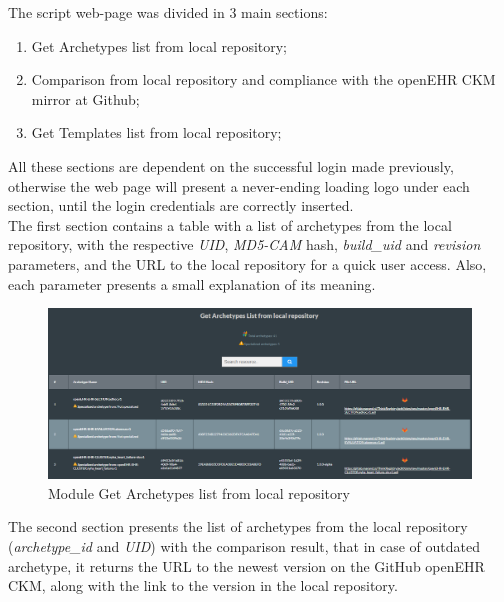 \documentclass[mim_thesis.tex]{subfiles}
\begin{document}
The script web-page was divided in 3 main sections: 

\begin{enumerate}[noitemsep]
\item Get Archetypes list from local repository;
\item Comparison from local repository and compliance with the openEHR CKM mirror at Github;
\item Get Templates list from local repository; 
\end{enumerate}

All these sections are dependent on the successful login made previously, otherwise the web page will present a never-ending loading logo under each section, until the login credentials are correctly inserted. \\

The first section contains a table with a list of archetypes from the local repository, with the respective \textit{UID}, \textit{MD5-CAM} hash, \textit{build\_uid} and \textit{revision} parameters, and the URL to the local repository for a quick user access. Also, each parameter presents a small explanation of its meaning. 

\begin{figure}[H]
	\centering
    \includegraphics[width=1\textwidth]{img/get_arch_list.PNG}
	\caption{Module Get Archetypes list from local repository }
	\label{fig:get_arch_list}
\end{figure}

The second section presents the list of archetypes from the local repository (\textit{archetype\_id} and \textit{UID}) with the comparison result, that in case of outdated archetype, it returns the URL to the newest version on the GitHub openEHR CKM, along with the link to the version in the local repository. 
\end{document}
